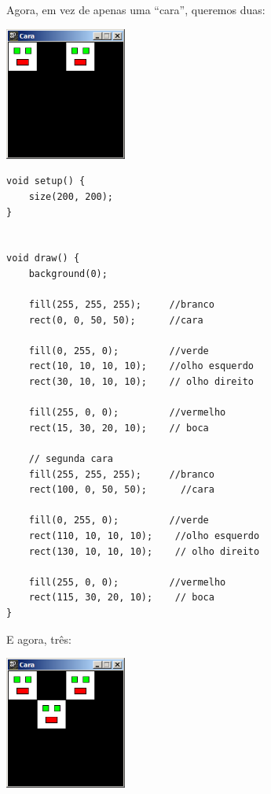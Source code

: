 Agora, em vez de apenas uma ``cara'', queremos duas:
\begin{center}
	\includegraphics[width=4cm]{images/cara2.eps}
\end{center}
\begin{lstlisting}
void setup() {
    size(200, 200);
}


void draw() {
    background(0);
    
    fill(255, 255, 255);     //branco
    rect(0, 0, 50, 50);      //cara
    
    fill(0, 255, 0);         //verde
    rect(10, 10, 10, 10);    //olho esquerdo
    rect(30, 10, 10, 10);    // olho direito
    
    fill(255, 0, 0);         //vermelho
    rect(15, 30, 20, 10);    // boca

    // segunda cara
    fill(255, 255, 255);     //branco
    rect(100, 0, 50, 50);      //cara
    
    fill(0, 255, 0);         //verde
    rect(110, 10, 10, 10);    //olho esquerdo
    rect(130, 10, 10, 10);    // olho direito
    
    fill(255, 0, 0);         //vermelho
    rect(115, 30, 20, 10);    // boca    
}
\end{lstlisting}
E agora, três:
\begin{center}
	\includegraphics[width=4cm]{images/cara3.eps}
\end{center}
